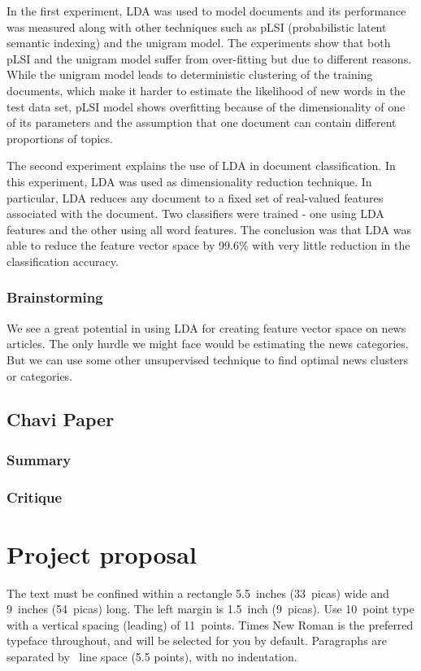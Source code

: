 \documentclass{article}
\begin{document}
In the first experiment, LDA was used to model documents and its performance was measured along with other techniques such as pLSI (probabilistic latent semantic indexing) and the unigram model. The experiments show that both pLSI and the unigram model suffer from over-fitting but due to different reasons. While the unigram model leads to deterministic clustering of the training documents, which make it harder to estimate the likelihood of new words in the test data set, pLSI model shows overfitting because of the dimensionality of one of its parameters and the assumption that one document can contain different proportions of topics. 

The second experiment explains the use of LDA in document classification. In this experiment, LDA was used as dimensionality reduction technique. In particular, LDA reduces any document to a fixed set of real-valued features associated with the document. 
Two classifiers were trained - one using LDA features and the other using all word features.
The conclusion was that LDA was able to reduce the feature vector space by 99.6\% with very little reduction in the classification accuracy. 

\subsubsection{Brainstorming}

We see a great potential in using LDA for creating feature vector space on news articles. The only hurdle we might face would be estimating the news categories. But we can use some other unsupervised technique to find optimal news clusters or categories.


\subsection{Chavi Paper}
\subsubsection{Summary}
\subsubsection{Critique}


\section{Project proposal}
\label{gen_inst}

The text must be confined within a rectangle 5.5~inches (33~picas) wide and
9~inches (54~picas) long. The left margin is 1.5~inch (9~picas).  Use 10~point
type with a vertical spacing (leading) of 11~points.  Times New Roman is the
preferred typeface throughout, and will be selected for you by default.
Paragraphs are separated by ~line space (5.5 points), with no
indentation.
\end{document}
